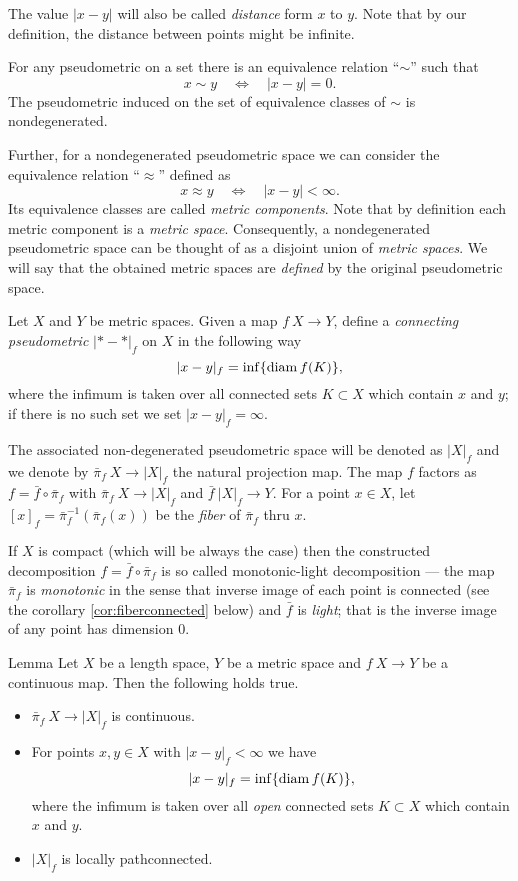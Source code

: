 \documentclass{article}
\begin{document}
The value $|x-y|$ will also be called \emph{distance} form $x$ to $y$.
Note that by our definition, the distance between points might be infinite.

For any pseudometric on a set there is an equivalence relation ``$\sim$'' such that 
\[x\sim y\quad\iff\quad|x-y|=0.\]
The pseudometric induced  on the set of equivalence classes of $\sim$ is nondegenerated.

Further, for a nondegenerated pseudometric space we can consider the equivalence relation ``$\approx$'' defined as 
\[x\approx y\quad\iff\quad|x-y|<\infty.\]
Its equivalence classes are called \emph{metric components}.
Note that by definition each metric component is a \emph{metric space}.
Consequently, a nondegenerated pseudometric space can be thought of as a disjoint union of \emph{metric spaces}.
We will say that the obtained metric spaces are \emph{defined} by the  original pseudometric space.

Let $X$ and $Y$ be metric spaces.
Given a map $f\:X\to Y$,
define a \emph{connecting pseudometric} $|{*}-{*}|_f$ on $X$ in
the following way
\[|x-y|_f=\inf\{\mathop{\rm diam}\nolimits f(K)\},\]
where the infimum is taken over all connected sets $K\subset X$ which contain $x$ and $y$;
if there is no such set we set $|x-y|_f=\infty$. 

The associated non-degenerated pseudometric space will be
denoted as $|X|_f$ and we denote by $\bar\pi_f\:X\to |X|_f$ the natural projection map.
The map $f$ factors as $f=\bar f\circ \bar\pi_f$ with $\bar\pi_f\:X\to|X|_f$ and $\bar f\:|X|_f\to Y$.
For a point $x\in X$, let $[x]_f=\bar\pi_f^{-1}(\bar\pi_f(x))$ be the \emph{fiber} of $\bar\pi_f$ thru $x$.

If $X$ is compact (which will be always the case)
then the constructed decomposition $f=\bar f\circ \bar\pi_f$ is so called monotonic-light decomposition --- the map $\bar\pi_f$ is \emph{monotonic}
in the sense that inverse image of each point is connected (see the corollary \ref{cor:fiberconnected} below)
and $\bar f$ is \emph{light}; 
that is the inverse image of any point has dimension $0$.

\begin{thm}{Lemma}\label{lem:picont}
Let $X$ be a length space, $Y$ be a metric space and $f\:X\to Y$ be a continuous map. 
Then the following holds true.
\begin{itemize}
\item $\bar\pi_f\:X\to|X|_f$ is continuous.

 \item For points $x,y\in X$ with $|x-y|_f<\infty$ we have
\[|x-y|_f=\inf\{\mathop{\rm diam}\nolimits f(K)\},\]
where the infimum is taken over all {\em open} connected sets $K\subset X$ which contain $x$ and $y$.

\item $|X|_f$ is locally pathconnected.
\end{itemize}

\end{thm}
\end{document}
